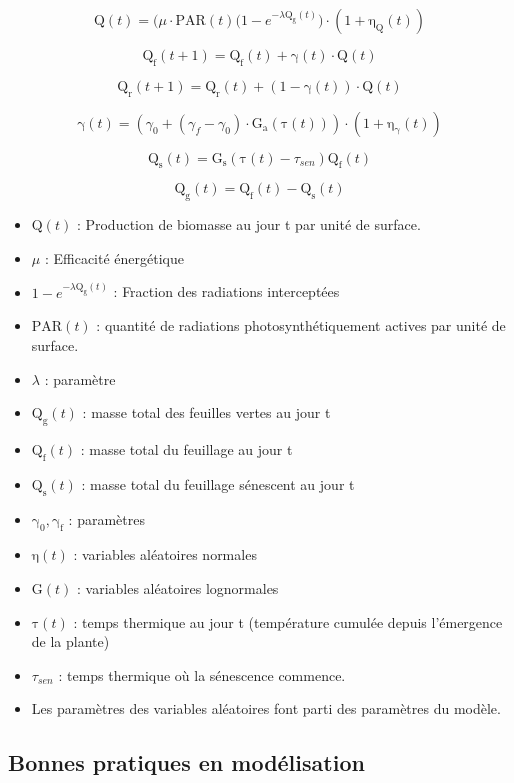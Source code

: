 \[ \mathrm{Q}(t) = \big(\mu\cdot\mathrm{PAR}(t)(1-e^{-\lambda\mathrm{Q_g}(t)}\big)\cdot(1+\mathrm{\eta_Q}(t)) \]

\[ \mathrm{Q_f}(t+1) = \mathrm{Q_f}(t) + \mathrm{\gamma}(t)\cdot\mathrm{Q}(t) \]

\[ \mathrm{Q_r}(t+1) = \mathrm{Q_r}(t) + (1 -\mathrm{\gamma}(t))\cdot\mathrm{Q}(t) \]

\[ \mathrm{\gamma}(t) = (\gamma_0 + (\gamma_f - \gamma_0)\cdot\mathrm{G_a}(\mathrm{\tau}(t)))\cdot(1+\mathrm{\eta_{\gamma}}(t)) \]

\[ \mathrm{Q_s}(t) = \mathrm{G_s}(\mathrm{\tau}(t)- \tau_{sen})\mathrm{Q_f}(t) \]

\[\mathrm{Q_g}(t) = \mathrm{Q_f}(t) - \mathrm{Q_s}(t) \]

\begin{itemize}

\item $\mathrm{Q}(t)$ : Production de biomasse au jour t par unité de surface.
\item $\mu$ : Efficacité énergétique
\item $1-e^{-\lambda\mathrm{Q_g}(t)}$ : Fraction des radiations interceptées
\item $\mathrm{PAR}(t)$ : quantité de radiations photosynthétiquement actives par unité de surface.
\item $\lambda$ : paramètre
\item $\mathrm{Q_g}(t)$ : masse total des feuilles vertes au jour t
\item $\mathrm{Q_f}(t)$ : masse total du feuillage au jour t
\item $\mathrm{Q_s}(t)$ : masse total du feuillage sénescent au jour t 
\item $\mathrm{\gamma_0}, \mathrm{\gamma_f}$ : paramètres
\item $\mathrm{\eta}(t)$ : variables aléatoires normales 
\item $\mathrm{G}(t)$ : variables aléatoires lognormales
\item $\mathrm{\tau}(t)$ : temps thermique au jour t (température cumulée depuis l'émergence de la plante)
\item $\tau_{sen}$ : temps thermique où la sénescence commence.
\item Les paramètres des variables aléatoires font parti des paramètres du modèle.

\end{itemize}

\subsection{Bonnes pratiques en modélisation}

